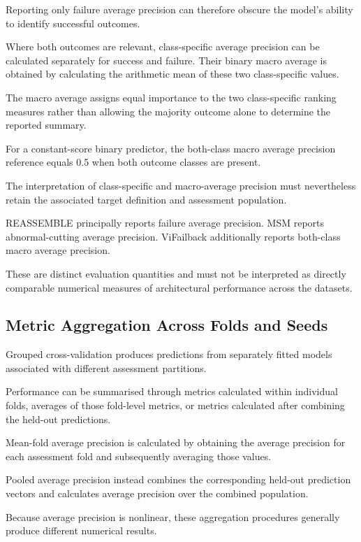 Reporting only failure average precision can therefore obscure the model’s ability to identify successful outcomes.

Where both outcomes are relevant, class-specific average precision can be calculated separately for success and failure. Their binary macro average is obtained by calculating the arithmetic mean of these two class-specific values.

The macro average assigns equal importance to the two class-specific ranking measures rather than allowing the majority outcome alone to determine the reported summary.

For a constant-score binary predictor, the both-class macro average precision reference equals 0.5 when both outcome classes are present.

The interpretation of class-specific and macro-average precision must nevertheless retain the associated target definition and assessment population.

REASSEMBLE principally reports failure average precision. MSM reports abnormal-cutting average precision. ViFailback additionally reports both-class macro average precision.

These are distinct evaluation quantities and must not be interpreted as directly comparable numerical measures of architectural performance across the datasets.

\subsection{Metric Aggregation Across Folds and Seeds}

Grouped cross-validation produces predictions from separately fitted models associated with different assessment partitions.

Performance can be summarised through metrics calculated within individual folds, averages of those fold-level metrics, or metrics calculated after combining the held-out predictions.

Mean-fold average precision is calculated by obtaining the average precision for each assessment fold and subsequently averaging those values.

Pooled average precision instead combines the corresponding held-out prediction vectors and calculates average precision over the combined population.

Because average precision is nonlinear, these aggregation procedures generally produce different numerical results.

